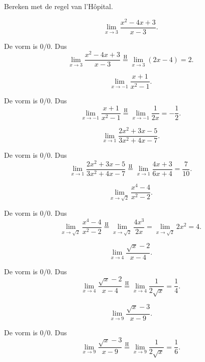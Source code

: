 \documentclass{ximera}
\begin{document}
\begin{oefening}[De vorm \(0/0\)]{\oefB\ESS}

Bereken met de regel van l'Hôpital.

\begin{question}
\[\lim_{x\to3}\frac{x^2-4x+3}{x-3}.\]

\begin{oplossing}
De vorm is \(0/0\). Dus
\[\lim_{x\to3}\frac{x^2-4x+3}{x-3}\overset{\mathrm H}{=}\lim_{x\to3}(2x-4)=2.\]
\end{oplossing}
\end{question}

\begin{question}
\[\lim_{x\to-1}\frac{x+1}{x^2-1}.\]

\begin{oplossing}
De vorm is \(0/0\). Dus
\[\lim_{x\to-1}\frac{x+1}{x^2-1}\overset{\mathrm H}{=}\lim_{x\to-1}\frac1{2x}=-\frac12.\]
\end{oplossing}
\end{question}

\begin{question}
\[\lim_{x\to1}\frac{2x^2+3x-5}{3x^2+4x-7}.\]

\begin{oplossing}
De vorm is \(0/0\). Dus
\[\lim_{x\to1}\frac{2x^2+3x-5}{3x^2+4x-7}\overset{\mathrm H}{=}\lim_{x\to1}\frac{4x+3}{6x+4}=\frac7{10}.\]
\end{oplossing}
\end{question}

\begin{question}
\[\lim_{x\to\sqrt2}\frac{x^4-4}{x^2-2}.\]

\begin{oplossing}
De vorm is \(0/0\). Dus
\[\lim_{x\to\sqrt2}\frac{x^4-4}{x^2-2}\overset{\mathrm H}{=}\lim_{x\to\sqrt2}\frac{4x^3}{2x}=\lim_{x\to\sqrt2}2x^2=4.\]
\end{oplossing}
\end{question}

\begin{question}
\[\lim_{x\to4}\frac{\sqrt{x}-2}{x-4}.\]

\begin{oplossing}
De vorm is \(0/0\). Dus
\[\lim_{x\to4}\frac{\sqrt{x}-2}{x-4}\overset{\mathrm H}{=}\lim_{x\to4}\frac1{2\sqrt{x}}=\frac14.\]
\end{oplossing}
\end{question}

\begin{question}
\[\lim_{x\to9}\frac{\sqrt{x}-3}{x-9}.\]

\begin{oplossing}
De vorm is \(0/0\). Dus
\[\lim_{x\to9}\frac{\sqrt{x}-3}{x-9}\overset{\mathrm H}{=}\lim_{x\to9}\frac1{2\sqrt{x}}=\frac16.\]
\end{oplossing}
\end{question}
\end{oefening}
\end{document}

